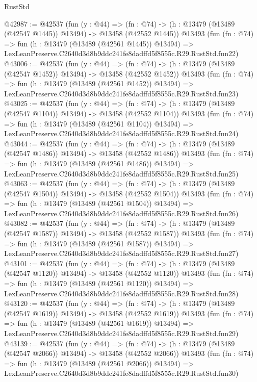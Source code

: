 \begin{lexlean}{RustStd}
\begin{coremodule}
@42987 := @42537
    (fun (y : @44) =>
    (fn : @74) -> (h : @13479 (@13489 (@42547 @1445)) @13494) -> @13458 (@42552 @1445))
    @13493
    (fun (fn : @74) =>
    fun (h : @13479 (@13489 (@42561 @1445)) @13494) =>
    LexLeanPreserve.C2640d3d8b9ddc241fe8dadffd5f8555c.R29.RustStd.fun22)
@43006 := @42537
    (fun (y : @44) =>
    (fn : @74) -> (h : @13479 (@13489 (@42547 @1452)) @13494) -> @13458 (@42552 @1452))
    @13493
    (fun (fn : @74) =>
    fun (h : @13479 (@13489 (@42561 @1452)) @13494) =>
    LexLeanPreserve.C2640d3d8b9ddc241fe8dadffd5f8555c.R29.RustStd.fun23)
@43025 := @42537
    (fun (y : @44) =>
    (fn : @74) -> (h : @13479 (@13489 (@42547 @1104)) @13494) -> @13458 (@42552 @1104))
    @13493
    (fun (fn : @74) =>
    fun (h : @13479 (@13489 (@42561 @1104)) @13494) =>
    LexLeanPreserve.C2640d3d8b9ddc241fe8dadffd5f8555c.R29.RustStd.fun24)
@43044 := @42537
    (fun (y : @44) =>
    (fn : @74) -> (h : @13479 (@13489 (@42547 @1486)) @13494) -> @13458 (@42552 @1486))
    @13493
    (fun (fn : @74) =>
    fun (h : @13479 (@13489 (@42561 @1486)) @13494) =>
    LexLeanPreserve.C2640d3d8b9ddc241fe8dadffd5f8555c.R29.RustStd.fun25)
@43063 := @42537
    (fun (y : @44) =>
    (fn : @74) -> (h : @13479 (@13489 (@42547 @1504)) @13494) -> @13458 (@42552 @1504))
    @13493
    (fun (fn : @74) =>
    fun (h : @13479 (@13489 (@42561 @1504)) @13494) =>
    LexLeanPreserve.C2640d3d8b9ddc241fe8dadffd5f8555c.R29.RustStd.fun26)
@43082 := @42537
    (fun (y : @44) =>
    (fn : @74) -> (h : @13479 (@13489 (@42547 @1587)) @13494) -> @13458 (@42552 @1587))
    @13493
    (fun (fn : @74) =>
    fun (h : @13479 (@13489 (@42561 @1587)) @13494) =>
    LexLeanPreserve.C2640d3d8b9ddc241fe8dadffd5f8555c.R29.RustStd.fun27)
@43101 := @42537
    (fun (y : @44) =>
    (fn : @74) -> (h : @13479 (@13489 (@42547 @1120)) @13494) -> @13458 (@42552 @1120))
    @13493
    (fun (fn : @74) =>
    fun (h : @13479 (@13489 (@42561 @1120)) @13494) =>
    LexLeanPreserve.C2640d3d8b9ddc241fe8dadffd5f8555c.R29.RustStd.fun28)
@43120 := @42537
    (fun (y : @44) =>
    (fn : @74) -> (h : @13479 (@13489 (@42547 @1619)) @13494) -> @13458 (@42552 @1619))
    @13493
    (fun (fn : @74) =>
    fun (h : @13479 (@13489 (@42561 @1619)) @13494) =>
    LexLeanPreserve.C2640d3d8b9ddc241fe8dadffd5f8555c.R29.RustStd.fun29)
@43139 := @42537
    (fun (y : @44) =>
    (fn : @74) -> (h : @13479 (@13489 (@42547 @2066)) @13494) -> @13458 (@42552 @2066))
    @13493
    (fun (fn : @74) =>
    fun (h : @13479 (@13489 (@42561 @2066)) @13494) =>
    LexLeanPreserve.C2640d3d8b9ddc241fe8dadffd5f8555c.R29.RustStd.fun30)

\end{coremodule}
\end{lexlean}
